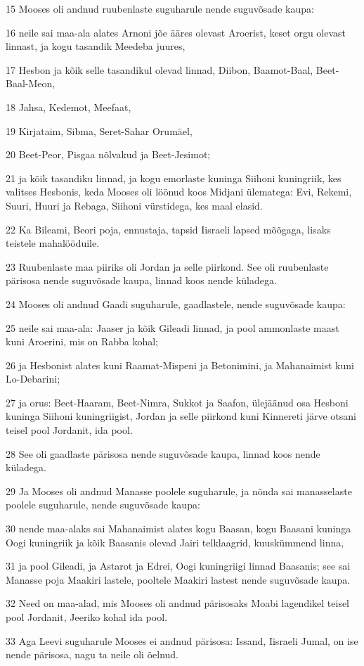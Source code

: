 \par 15 Mooses oli andnud ruubenlaste suguharule nende suguvõsade kaupa:
\par 16 neile sai maa-ala alates Arnoni jõe ääres olevast Aroerist, keset orgu olevast linnast, ja kogu tasandik Meedeba juures,
\par 17 Hesbon ja kõik selle tasandikul olevad linnad, Diibon, Baamot-Baal, Beet-Baal-Meon,
\par 18 Jahsa, Kedemot, Meefaat,
\par 19 Kirjataim, Sibma, Seret-Sahar Orumäel,
\par 20 Beet-Peor, Pisgaa nõlvakud ja Beet-Jesimot;
\par 21 ja kõik tasandiku linnad, ja kogu emorlaste kuninga Siihoni kuningriik, kes valitses Hesbonis, keda Mooses oli löönud koos Midjani ülematega: Evi, Rekemi, Suuri, Huuri ja Rebaga, Siihoni vürstidega, kes maal elasid.
\par 22 Ka Bileami, Beori poja, ennustaja, tapsid Iisraeli lapsed mõõgaga, lisaks teistele mahalööduile.
\par 23 Ruubenlaste maa piiriks oli Jordan ja selle piirkond. See oli ruubenlaste pärisosa nende suguvõsade kaupa, linnad koos nende küladega.
\par 24 Mooses oli andnud Gaadi suguharule, gaadlastele, nende suguvõsade kaupa:
\par 25 neile sai maa-ala: Jaaser ja kõik Gileadi linnad, ja pool ammonlaste maast kuni Aroerini, mis on Rabba kohal;
\par 26 ja Hesbonist alates kuni Raamat-Mispeni ja Betonimini, ja Mahanaimist kuni Lo-Debarini;
\par 27 ja orus: Beet-Haaram, Beet-Nimra, Sukkot ja Saafon, ülejäänud osa Hesboni kuninga Siihoni kuningriigist, Jordan ja selle piirkond kuni Kinnereti järve otsani teisel pool Jordanit, ida pool.
\par 28 See oli gaadlaste pärisosa nende suguvõsade kaupa, linnad koos nende küladega.
\par 29 Ja Mooses oli andnud Manasse poolele suguharule, ja nõnda sai manasselaste poolele suguharule, nende suguvõsade kaupa:
\par 30 nende maa-alaks sai Mahanaimist alates kogu Baasan, kogu Baasani kuninga Oogi kuningriik ja kõik Baasanis olevad Jairi telklaagrid, kuuskümmend linna,
\par 31 ja pool Gileadi, ja Astarot ja Edrei, Oogi kuningriigi linnad Baasanis; see sai Manasse poja Maakiri lastele, pooltele Maakiri lastest nende suguvõsade kaupa.
\par 32 Need on maa-alad, mis Mooses oli andnud pärisosaks Moabi lagendikel teisel pool Jordanit, Jeeriko kohal ida pool.
\par 33 Aga Leevi suguharule Mooses ei andnud pärisosa: Issand, Iisraeli Jumal, on ise nende pärisosa, nagu ta neile oli öelnud.

